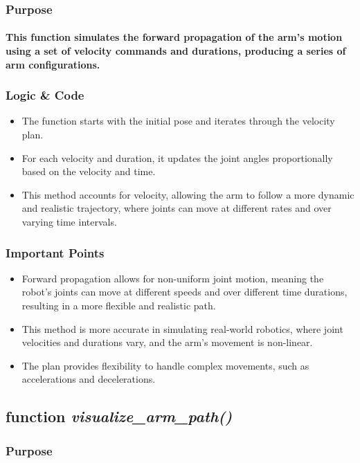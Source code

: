 \documentclass[12pt, letterpaper]{article}
\begin{document}
\subsubsection{Purpose}
\paragraph{This function simulates the forward propagation of the arm's motion using a set of velocity commands and durations, producing a series of arm configurations.}
\subsubsection{Logic \& Code}
\begin{itemize}
    \item{The function starts with the initial pose and iterates through the velocity plan.}
    \item{For each velocity and duration, it updates the joint angles proportionally based on the velocity and time.}
    \item{This method accounts for velocity, allowing the arm to follow a more dynamic and realistic trajectory, where joints can move at different rates and over varying time intervals.}
\end{itemize}
\subsubsection{Important Points}
\begin{itemize}
    \item{Forward propagation allows for non-uniform joint motion, meaning the robot's joints can move at different speeds and over different time durations, resulting in a more flexible and realistic path.}
    \item{This method is more accurate in simulating real-world robotics, where joint velocities and durations vary, and the arm's movement is non-linear.}
    \item{The plan provides flexibility to handle complex movements, such as accelerations and decelerations.}
\end{itemize}
\subsection{function \textit{visualize\_arm\_path()}}
\subsubsection{Purpose}
\end{document}
